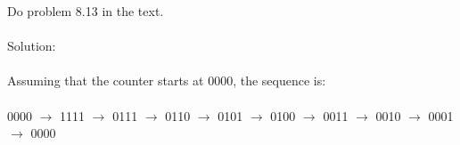 Do problem 8.13 in the text. \\ \\

Solution: \\ \\
Assuming that the counter starts at 0000, the sequence is: \\ \\
0000 $\rightarrow$ 1111 $\rightarrow$ 0111 $\rightarrow$ 0110 $\rightarrow$ 0101 $\rightarrow$ 0100 $\rightarrow$ 0011 $\rightarrow$ 0010 $\rightarrow$ 0001 $\rightarrow$ 0000 \\ \\
